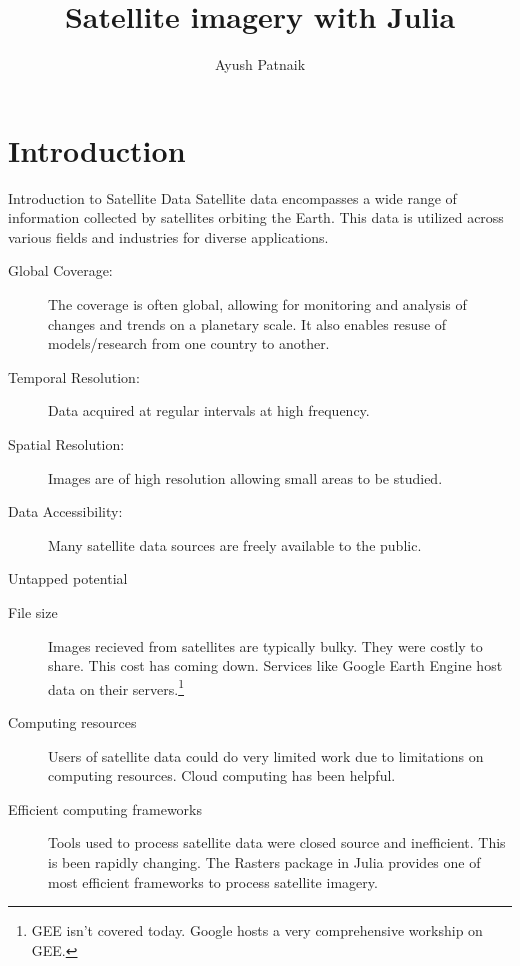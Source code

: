 \documentclass[aspectratio=169]{beamer} %
\title{Satellite imagery with Julia}
\author{Ayush Patnaik}
\begin{document}
\begin{frame}
  \titlepage
\end{frame}

\section{Introduction}

\begin{frame}{Introduction to Satellite Data}
  Satellite data encompasses a wide range of information collected by satellites orbiting the Earth. This data is utilized across various fields and industries for diverse applications. 

  \begin{description}
      
      \item[Global Coverage:] The coverage is often global, allowing for monitoring and analysis of changes and trends on a planetary scale. It also enables resuse of models/research from one country to another. 
      
      \item[Temporal Resolution:] Data acquired at regular intervals at high frequency. 
      
      \item[Spatial Resolution:] Images are of high resolution allowing small areas to be studied. 
      
      \item[Data Accessibility:] Many satellite data sources are freely available to the public. 
  \end{description}
  
\end{frame}


  \begin{frame}{Untapped potential}
    \begin{description}
      \item[File size] Images recieved from satellites are typically bulky. They were costly to share. This cost has coming down. Services like Google Earth Engine host data on their servers.\footnote{GEE isn't covered today. Google hosts a very comprehensive workship on GEE.}  %
      \item[Computing resources] Users of satellite data could do very limited work due to limitations on computing resources. Cloud computing has been helpful. 
      \item[Efficient computing frameworks] Tools used to process satellite data were closed source and inefficient. This is been rapidly changing. The Rasters package in Julia provides one of most efficient frameworks to process satellite imagery. 
    \end{description}
  \end{frame}
\end{document}
